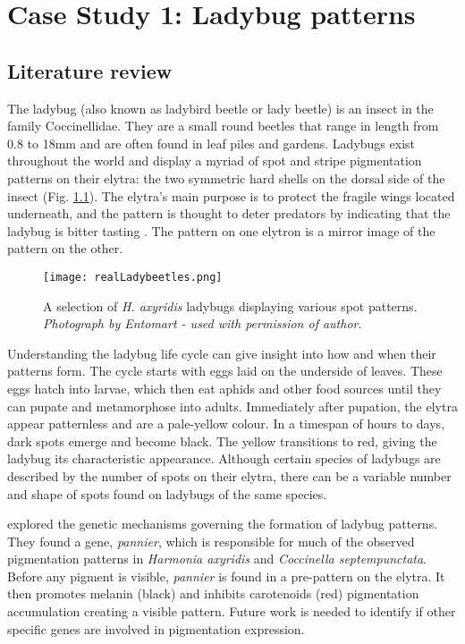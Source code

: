 \chapter{Case Study 1: Ladybug patterns}
\section{Literature review}
The ladybug (also known as ladybird beetle or lady beetle) is an insect in the family Coccinellidae. They are a small round beetles that range in length from 0.8 to 18mm \citep{King1996} and are often found in leaf piles and gardens. Ladybugs exist throughout the world and display a myriad of spot and stripe pigmentation patterns on their elytra: the two symmetric hard shells on the dorsal side of the insect (Fig. \ref{fig:realLadyBugPatterns}). The elytra's main purpose is to protect the fragile wings located underneath, and the pattern is thought to deter predators by indicating that the ladybug is bitter tasting \citep{King1996}. The pattern on one elytron is a mirror image of the pattern on the other. 

\begin{figure}[ht]
	\centering
	\texttt{[image: realLadybeetles.png]}
	\caption[A selection of \textit{H. axyridis} ladybugs displaying various spot patterns]{A selection of \textit{H. axyridis} ladybugs displaying various spot patterns. \textit{Photograph \textcopyright{} by Entomart - used with permission of author\footnotemark{}}.}
	\label{fig:realLadyBugPatterns}
\end{figure}

Understanding the ladybug life cycle can give insight into how and when their patterns form. The cycle starts with eggs laid on the underside of leaves. These eggs hatch into larvae, which then eat aphids and other food sources until they can pupate and metamorphose into adults. Immediately after pupation, the elytra appear patternless and are a pale-yellow colour. In a timespan of hours to days, dark spots emerge and become black. The yellow transitions to red, giving the ladybug its characteristic appearance. Although certain species of ladybugs are described by the number of spots on their elytra, there can be a variable number and shape of spots found on ladybugs of the same species.


\citet{Ando2018} explored the genetic mechanisms governing the formation of ladybug patterns. They found a gene, \textit{pannier}, which is responsible for much of the observed pigmentation patterns in \textit{Harmonia axyridis} and \textit{Coccinella septempunctata}. Before any pigment is visible, \textit{pannier} is found in a pre-pattern on the elytra. It then promotes melanin (black) and inhibits carotenoids (red) pigmentation accumulation creating a visible pattern. Future work is needed to identify if other specific genes are involved in pigmentation expression.

